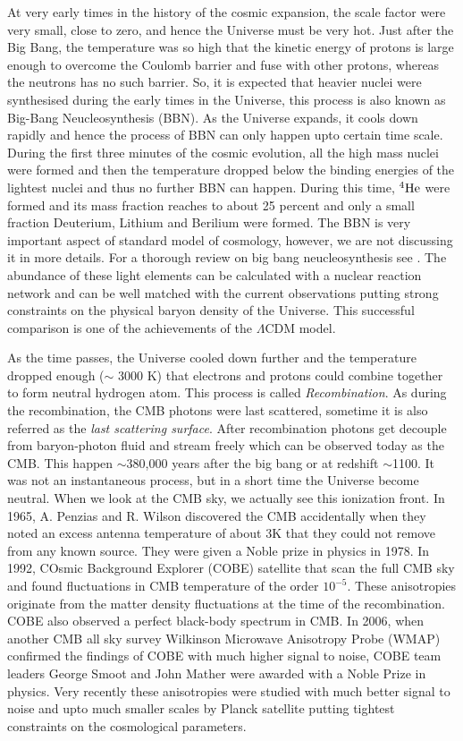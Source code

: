 At  very early times in the history of the cosmic expansion, the scale factor 
were very small, close to zero, and hence the Universe must be very hot. Just
after the Big Bang, the temperature was so high that the kinetic energy
of protons is large enough to overcome the Coulomb barrier and fuse with other
protons, whereas the neutrons has no such barrier. So, it is expected that
heavier nuclei were synthesised during the early times in the Universe, this
process is also known as Big-Bang Neucleosynthesis (BBN). As the Universe expands, 
it cools down rapidly and hence the process of BBN can only
happen upto certain time scale. During the first three minutes of the cosmic
evolution, all the high mass nuclei were formed and then the temperature
dropped below the binding energies of the lightest nuclei and thus no
further BBN can happen. During this time, $^4{\rm He}$ were formed and 
its mass fraction reaches to about 25 percent and only a small fraction 
Deuterium, Lithium and Berilium were formed. 
The BBN is very important
aspect of standard model of cosmology, however, we are not discussing it in more
details. For a thorough review on big bang 
neucleosynthesis see \cite{}. The abundance of these light elements 
can be calculated with a nuclear reaction network and can be well matched
with the current observations putting strong constraints on the physical
baryon density of the Universe. This successful comparison is one of the
achievements of the $\Lambda$CDM model.

As the time passes, the Universe cooled down further and the temperature
dropped enough ($\sim$ 3000 K) that electrons and protons could combine 
together to form neutral hydrogen
atom. This process is called {\it Recombination}. As during the recombination,
the CMB photons were last scattered, sometime it is also referred
as the {\it last scattering surface}. After recombination photons 
get decouple from baryon-photon fluid and stream freely which
can be observed today as the CMB. 
This happen $\sim$380,000 years after the big bang or at redshift 
$\sim$1100. It was not an instantaneous process, but in a short time
the Universe become neutral. When we look at the CMB sky, we actually see
this ionization front. In 1965, A. Penzias and R. Wilson discovered the CMB
accidentally when they noted an excess antenna temperature of about 3K that
they could not remove from any known source. They were given a Noble prize in 
physics in 1978. In 1992, COsmic Background Explorer (COBE) satellite that
scan the full CMB sky and found fluctuations in CMB temperature of the 
order $10^{-5}$. These anisotropies originate from the matter density
fluctuations at the time of the recombination. COBE also observed a perfect
black-body spectrum in CMB. In 2006, when another CMB all sky survey 
Wilkinson Microwave Anisotropy Probe (WMAP) confirmed the findings of COBE
with much higher signal to noise, COBE team leaders George Smoot and John Mather
were awarded with a Noble Prize in physics. Very recently these anisotropies were studied
with much better signal to noise and upto much smaller scales by Planck satellite
putting tightest constraints on the cosmological parameters.

